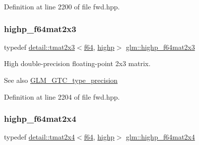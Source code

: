 Definition at line 2200 of file fwd.\+hpp.

\mbox{\label{group__gtc__type__precision_gafb5b42b29b3bd7f1605483223fa35312}} 
\subsubsection{\texorpdfstring{highp\+\_\+f64mat2x3}{highp\_f64mat2x3}}
{\footnotesize\ttfamily typedef \hyperlink{structglm_1_1detail_1_1tmat2x3}{detail\+::tmat2x3}$<$\hyperlink{group__gtc__type__precision_ga2bba392e555124b36cde6abba349bab3}{f64}, \hyperlink{namespaceglm_a0f04f086094c747d227af4425893f545ac6f7eab42eacbb10d59a58e95e362074}{highp}$>$ \hyperlink{group__gtc__type__precision_gafb5b42b29b3bd7f1605483223fa35312}{glm\+::highp\+\_\+f64mat2x3}}

High double-\/precision floating-\/point 2x3 matrix. \begin{DoxySeeAlso}{See also}
\hyperlink{group__gtc__type__precision}{G\+L\+M\+\_\+\+G\+T\+C\+\_\+type\+\_\+precision} 
\end{DoxySeeAlso}


Definition at line 2204 of file fwd.\+hpp.

\mbox{\label{group__gtc__type__precision_ga72fae79e6633cbc6bf691f69278b36d3}} 
\subsubsection{\texorpdfstring{highp\+\_\+f64mat2x4}{highp\_f64mat2x4}}
{\footnotesize\ttfamily typedef \hyperlink{structglm_1_1detail_1_1tmat2x4}{detail\+::tmat2x4}$<$\hyperlink{group__gtc__type__precision_ga2bba392e555124b36cde6abba349bab3}{f64}, \hyperlink{namespaceglm_a0f04f086094c747d227af4425893f545ac6f7eab42eacbb10d59a58e95e362074}{highp}$>$ \hyperlink{group__gtc__type__precision_ga72fae79e6633cbc6bf691f69278b36d3}{glm\+::highp\+\_\+f64mat2x4}}

